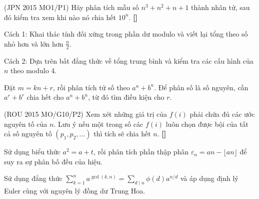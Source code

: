 \documentclass[./m.tex]{subfiles}
\begin{document}
\vspace{1em}

\begin{hint*}(\gls{JPN 2015 MO}1/P1)
    Hãy phân tích mẫu số \( n^3 + n^2 + n + 1 \) thành nhân tử, sau đó kiểm tra xem khi nào nó chia hết \( 10^n \).
	\textbf{[]}
\end{hint*}

\vspace{1em}

\begin{hint*}
	Cách 1: Khai thác tính đối xứng trong phần dư modulo và viết lại tổng theo số nhỏ hơn và lớn hơn \( \frac{n}{2} \).

	Cách 2: Dựa trên bất đẳng thức về tổng trung bình và kiểm tra các cấu hình của \( n \) theo modulo 4.
\end{hint*}

\vspace{1em}

\begin{hint*}
	Đặt \( m = kn + r \), rồi phân tích tử số theo \( a^n + b^n \).
	Để phân số là số nguyên, cần \( a^r + b^r \) chia hết cho \( a^n + b^n \), từ đó tìm điều kiện cho \( r \).
\end{hint*}

\vspace{1em}

\begin{hint*}(\gls{ROU 2015 MO}/G10/P2)
	Xem xét những giá trị của \(f(i)\) phải chứa đủ các ước nguyên tố của \(n\).
    Lưu ý nếu một trong số các \(f(i)\) luôn chọn được bội của tất cả số nguyên tố \((p_1, p_2, \dots)\) thì tích sẽ chia hết \(n\).
	\textbf{[]}
\end{hint*}

\vspace{1em}

\begin{hint*}
	Sử dụng biểu thức \(a^2 = a + t\), rồi phân tích phần thập phân \(\varepsilon_n = a n - \lfloor a n \rfloor\) để suy ra sự phân bố đều của hiệu.
\end{hint*}

\vspace{1em}

\begin{hint*}
	Sử dụng đẳng thức \(\displaystyle \sum_{k=1}^{n} a^{\gcd(k,n)} = \sum_{d \mid n} \phi(d) a^{n/d}\) và áp dụng định lý Euler cùng với nguyên lý đồng dư Trung Hoa.
\end{hint*}
\end{document}
